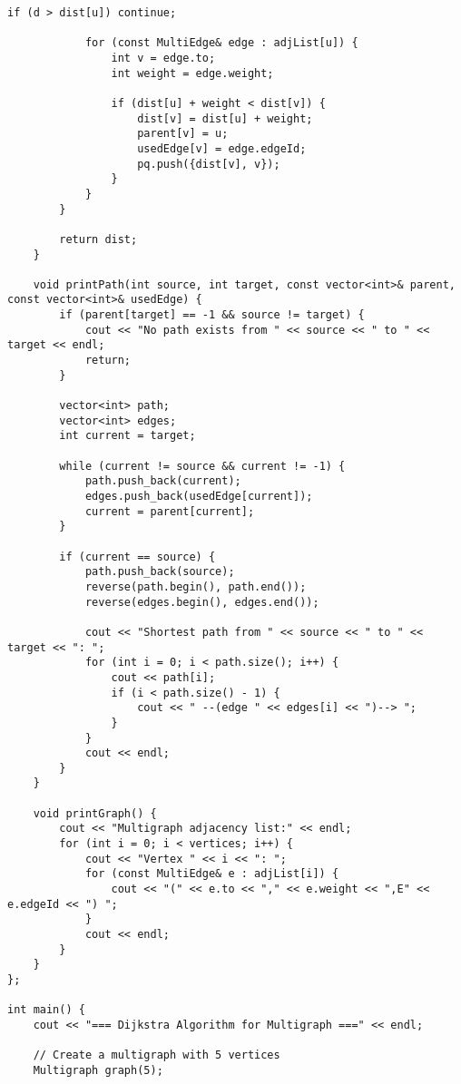 \documentclass[12pt,a4paper]{article}
\begin{document}
\begin{lstlisting}[caption={Thuật toán Dijkstra cho đa đồ thị}]
            if (d > dist[u]) continue;
            
            for (const MultiEdge& edge : adjList[u]) {
                int v = edge.to;
                int weight = edge.weight;
                
                if (dist[u] + weight < dist[v]) {
                    dist[v] = dist[u] + weight;
                    parent[v] = u;
                    usedEdge[v] = edge.edgeId;
                    pq.push({dist[v], v});
                }
            }
        }
        
        return dist;
    }
    
    void printPath(int source, int target, const vector<int>& parent, const vector<int>& usedEdge) {
        if (parent[target] == -1 && source != target) {
            cout << "No path exists from " << source << " to " << target << endl;
            return;
        }
        
        vector<int> path;
        vector<int> edges;
        int current = target;
        
        while (current != source && current != -1) {
            path.push_back(current);
            edges.push_back(usedEdge[current]);
            current = parent[current];
        }
        
        if (current == source) {
            path.push_back(source);
            reverse(path.begin(), path.end());
            reverse(edges.begin(), edges.end());
            
            cout << "Shortest path from " << source << " to " << target << ": ";
            for (int i = 0; i < path.size(); i++) {
                cout << path[i];
                if (i < path.size() - 1) {
                    cout << " --(edge " << edges[i] << ")--> ";
                }
            }
            cout << endl;
        }
    }
    
    void printGraph() {
        cout << "Multigraph adjacency list:" << endl;
        for (int i = 0; i < vertices; i++) {
            cout << "Vertex " << i << ": ";
            for (const MultiEdge& e : adjList[i]) {
                cout << "(" << e.to << "," << e.weight << ",E" << e.edgeId << ") ";
            }
            cout << endl;
        }
    }
};

int main() {
    cout << "=== Dijkstra Algorithm for Multigraph ===" << endl;
    
    // Create a multigraph with 5 vertices
    Multigraph graph(5);
    

\end{lstlisting}
\end{document}
